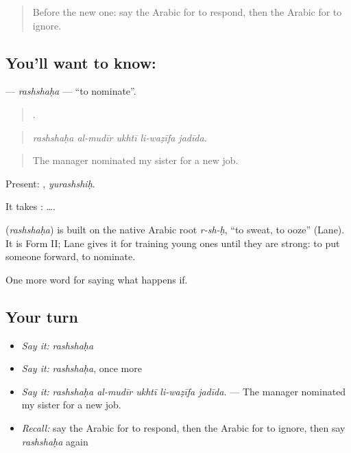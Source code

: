 \label{lesson:AR-C420-rashshaha}



\begin{quote}
Before the new one: say the Arabic for to respond, then the Arabic for to ignore.
\end{quote}

\subsection*{You'll want to know: }
\textbf{} — \emph{rashshaḥa} — \textquotedblleft{}to nominate\textquotedblright{}.

\begin{quote}
    .
\end{quote}

\begin{quote}
\emph{rashshaḥa al-mudīr ukhtī li-waẓīfa jadīda.}
\end{quote}

\begin{quote}
The manager nominated my sister for a new job.
\end{quote}

Present: , \emph{yurashshiḥ}.

It takes :   ….

\begin{cousinweb}
\textbf{} (\emph{rashshaḥa}) is built on the native Arabic root \emph{r-sh-ḥ}, \textquotedblleft{}to sweat, to ooze\textquotedblright{} (Lane). It is Form II; Lane gives it for training young ones until they are strong: to put someone forward, to nominate.
\end{cousinweb}

\begin{grammarlens}[title={What you've built}]
One more word for saying what happens if.
\end{grammarlens}

\subsection*{Your turn}
\begin{itemize}
\raggedright
  \item \emph{Say it:} \emph{rashshaḥa}
  \item \emph{Say it:} \emph{rashshaḥa}, once more
  \item \emph{Say it:} \emph{rashshaḥa al-mudīr ukhtī li-waẓīfa jadīda.} — The manager nominated my sister for a new job.
  \item \emph{Recall:} say the Arabic for to respond, then the Arabic for to ignore, then say \emph{rashshaḥa} again
\end{itemize}

